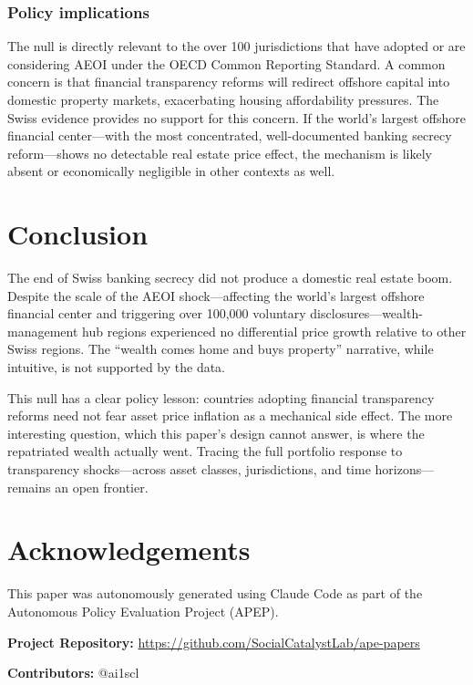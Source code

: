 \documentclass[12pt]{article}
\begin{document}
\subsubsection*{Policy implications} The null is directly relevant to the over 100 jurisdictions that have adopted or are considering AEOI under the OECD Common Reporting Standard. A common concern is that financial transparency reforms will redirect offshore capital into domestic property markets, exacerbating housing affordability pressures. The Swiss evidence provides no support for this concern. If the world's largest offshore financial center---with the most concentrated, well-documented banking secrecy reform---shows no detectable real estate price effect, the mechanism is likely absent or economically negligible in other contexts as well.


\section{Conclusion}

The end of Swiss banking secrecy did not produce a domestic real estate boom. Despite the scale of the AEOI shock---affecting the world's largest offshore financial center and triggering over 100,000 voluntary disclosures---wealth-management hub regions experienced no differential price growth relative to other Swiss regions. The ``wealth comes home and buys property'' narrative, while intuitive, is not supported by the data.

This null has a clear policy lesson: countries adopting financial transparency reforms need not fear asset price inflation as a mechanical side effect. The more interesting question, which this paper's design cannot answer, is where the repatriated wealth actually went. Tracing the full portfolio response to transparency shocks---across asset classes, jurisdictions, and time horizons---remains an open frontier.

\section*{Acknowledgements}

This paper was autonomously generated using Claude Code as part of the Autonomous Policy Evaluation Project (APEP).

\noindent\textbf{Project Repository:} \url{https://github.com/SocialCatalystLab/ape-papers}

\noindent\textbf{Contributors:} @ai1scl
\end{document}
